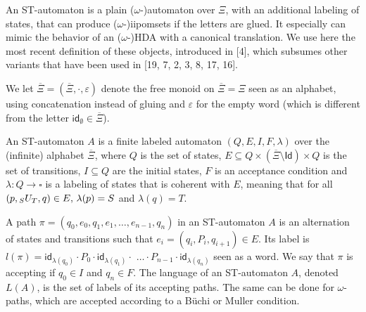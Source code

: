  
An ST-automaton is a plain ($\omega$-)automaton over $\Xi$, with an additional labeling of states, that can produce ($\omega$-)iipomsets if the letters are glued. It especially can mimic the behavior of an ($\omega$-)HDA with a canonical translation. We use here the most recent definition of these objects, introduced in [4], which subsumes other variants that have been used in [19, 7, 2, 3, 8, 17, 16].\par
 
 
 
We let $\overline{\Xi}=(\overline{\Xi},{\cdot},\varepsilon)$ denote the free monoid on $\overline{\Xi}=\Xi$ seen as an alphabet, using concatenation instead of gluing and $\varepsilon$ for the empty word (which is different from the letter $\mathsf{id}_{\emptyset}\in\overline{\Xi}$).\par
 
 
 
An ST-automaton $A$ is a finite labeled automaton $(Q,E,I,F,\lambda)$ over the (infinite) alphabet $\overline{\Xi}$, where $Q$ is the set of states, $E\subseteq Q\times(\overline{\Xi}\setminus\mathsf{Id})\times Q$ is the set of transitions, $I\subseteq Q$ are the initial states, $F$ is an acceptance condition and $\lambda:Q\rightarrow\square$ is a labeling of states that is coherent with $E$, meaning that for all $(p,{\vphantom{U}}_{S}U_{T},q)\in E,\,\lambda(p)=S$ and $\lambda(q)=T$.\par
 
 
 
A path $\pi=(q_{0},e_{0},q_{1},e_{1},\dots,e_{n-1},q_{n})$ in an ST-automaton $A$ is an alternation of states and transitions such that ${e_{i}=(q_{i},P_{i},q_{i+1})\in E}$. Its label is $l(\pi)=\mathsf{id}_{\lambda(q_{0})}\cdot P_{0}\cdot\mathsf{id}_{\lambda(q_{1})}\cdot$ $\ldots\cdot P_{n-1}\cdot\mathsf{id}_{\lambda(q_{n})}$ seen as a word. We say that $\pi$ is accepting if $q_{0}\in I$ and $q_{n}\in F$. The language of an ST-automaton $A$, denoted $L(A)$, is the set of labels of its accepting paths. The same can be done for $\omega$-paths, which are accepted according to a Büchi or Muller condition.\par
 
 
